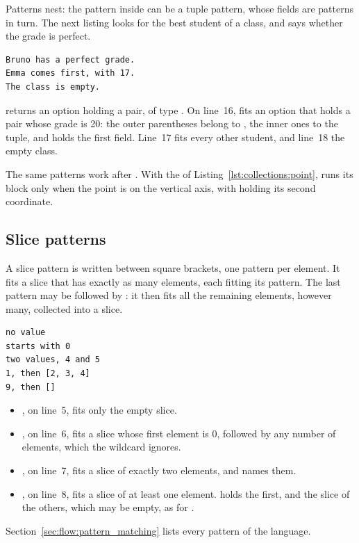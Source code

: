 Patterns nest: the pattern inside  can be a tuple pattern, whose
fields are patterns in turn. The next listing looks for the best student of a
class, and says whether the grade is perfect.


\vspace{-10pt}%
\begin{lstlisting}[style=bashVerb]
Bruno has a perfect grade.
Emma comes first, with 17.
The class is empty.
\end{lstlisting}

 returns an option holding a pair, of type
. On line~16,  fits an option that
holds a pair whose grade is 20: the outer parentheses belong to , the
inner ones to the tuple, and  holds the first field. Line~17 fits
every other student, and line~18 the empty class.

The same patterns work after . With the  of
Listing~\ref{lst:collections:point}, 
runs its block only when the point is on the vertical axis, with 
holding its second coordinate.

\subsection{Slice patterns}

A slice pattern is written between square brackets, one pattern per element.
It fits a slice that has exactly as many elements, each fitting its pattern. The
last pattern may be followed by : it then fits all the remaining
elements, however many, collected into a slice.


\vspace{-10pt}%
\begin{lstlisting}[style=bashVerb]
no value
starts with 0
two values, 4 and 5
1, then [2, 3, 4]
9, then []
\end{lstlisting}

\begin{itemize}
\item \token{[]}, on line~5, fits only the empty slice.
\item \token{[0, \_...]}, on line~6, fits a slice whose first element is 0,
  followed by any number of elements, which the wildcard ignores.
\item \token{[a, b]}, on line~7, fits a slice of exactly two elements, and names
  them.
\item {}, on line~8, fits a slice of at least one
  element.  holds the first, and  the slice of the
  others, which may be empty, as for \token{[9]}.
\end{itemize}

Section~\ref{sec:flow:pattern_matching} lists every pattern of the language.
